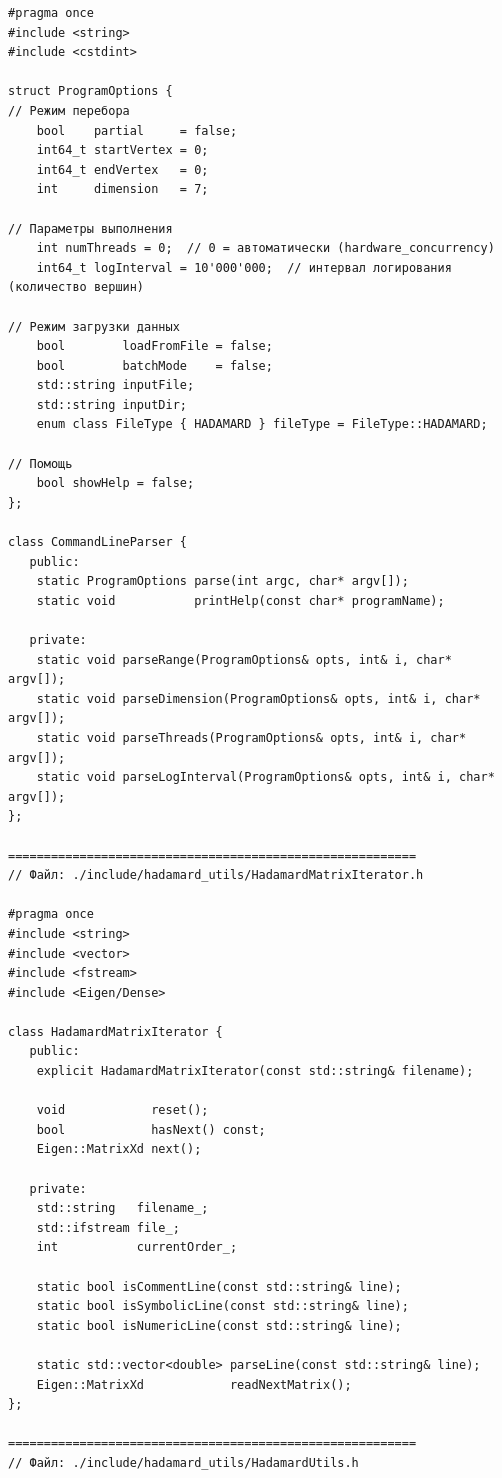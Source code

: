 \documentclass[appendix_B]{subfiles}
\begin{document}
\begin{lstlisting}
#pragma once
#include <string>
#include <cstdint>

struct ProgramOptions {
// Режим перебора
    bool    partial     = false;
    int64_t startVertex = 0;
    int64_t endVertex   = 0;
    int     dimension   = 7;

// Параметры выполнения
    int numThreads = 0;  // 0 = автоматически (hardware_concurrency)
    int64_t logInterval = 10'000'000;  // интервал логирования (количество вершин)

// Режим загрузки данных
    bool        loadFromFile = false;
    bool        batchMode    = false;
    std::string inputFile;
    std::string inputDir;
    enum class FileType { HADAMARD } fileType = FileType::HADAMARD;

// Помощь
    bool showHelp = false;
};

class CommandLineParser {
   public:
    static ProgramOptions parse(int argc, char* argv[]);
    static void           printHelp(const char* programName);

   private:
    static void parseRange(ProgramOptions& opts, int& i, char* argv[]);
    static void parseDimension(ProgramOptions& opts, int& i, char* argv[]);
    static void parseThreads(ProgramOptions& opts, int& i, char* argv[]);
    static void parseLogInterval(ProgramOptions& opts, int& i, char* argv[]);
};

=========================================================
// Файл: ./include/hadamard_utils/HadamardMatrixIterator.h

#pragma once
#include <string>
#include <vector>
#include <fstream>
#include <Eigen/Dense>

class HadamardMatrixIterator {
   public:
    explicit HadamardMatrixIterator(const std::string& filename);

    void            reset();
    bool            hasNext() const;
    Eigen::MatrixXd next();

   private:
    std::string   filename_;
    std::ifstream file_;
    int           currentOrder_;

    static bool isCommentLine(const std::string& line);
    static bool isSymbolicLine(const std::string& line);
    static bool isNumericLine(const std::string& line);

    static std::vector<double> parseLine(const std::string& line);
    Eigen::MatrixXd            readNextMatrix();
};

=========================================================
// Файл: ./include/hadamard_utils/HadamardUtils.h


\end{lstlisting}
\end{document}
